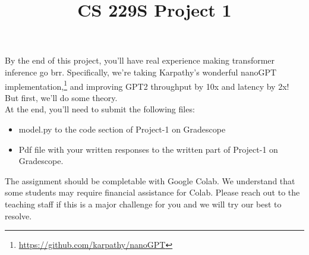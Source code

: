 \documentclass[10pt, letterpaper]{article}
\title{CS 229S Project 1}
\begin{document}
\maketitle

By the end of this project, you'll have real experience making transformer inference go brr. Specifically, we're taking Karpathy's wonderful nanoGPT implementation,\footnote{\url{https://github.com/karpathy/nanoGPT}} and improving GPT2 throughput by 10x and latency by 2x! But first, we'll do some theory. \\

At the end, you'll need to submit the following files:
\begin{itemize}
    \item model.py to the code section of Project-1 on Gradescope
    \item Pdf file with your written responses to the written part of Project-1 on Gradescope. 
\end{itemize}

The assignment should be completable with Google Colab. We understand that some students may require financial assistance for Colab. Please reach out to the teaching staff if this is a major challenge for you and we will try our best to resolve. 






% 
\end{document}
